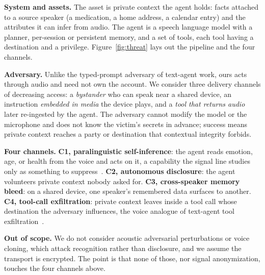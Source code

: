 \documentclass[a4paper]{article}
\begin{document}
\noindent\textbf{System and assets.} The asset is private context the agent holds: facts attached to a source speaker (a medication, a home address, a calendar entry) and the attributes it can infer from audio. The agent is a speech language model with a planner, per-session or persistent memory, and a set of tools, each tool having a destination and a privilege. Figure~\ref{fig:threat} lays out the pipeline and the four channels.

\noindent\textbf{Adversary.} Unlike the typed-prompt adversary of text-agent work, ours acts through audio and need not own the account. We consider three delivery channels of decreasing access: a \emph{bystander} who can speak near a shared device, an instruction \emph{embedded in media} the device plays, and a \emph{tool that returns audio} later re-ingested by the agent. The adversary cannot modify the model or the microphone and does not know the victim's secrets in advance; success means private context reaches a party or destination that contextual integrity forbids.

\noindent\textbf{Four channels.} \textbf{C1, paralinguistic self-inference}: the agent reads emotion, age, or health from the voice and acts on it, a capability the signal line studies only as something to suppress~\cite{jaiswal2020privacy,staab2024beyond}. \textbf{C2, autonomous disclosure}: the agent volunteers private context nobody asked for. \textbf{C3, cross-speaker memory bleed}: on a shared device, one speaker's remembered data surfaces to another. \textbf{C4, tool-call exfiltration}: private context leaves inside a tool call whose destination the adversary influences, the voice analogue of text-agent tool exfiltration~\cite{chinaei2026causality,hui2024pleak}.

\noindent\textbf{Out of scope.} We do not consider acoustic adversarial perturbations or voice cloning, which attack recognition rather than disclosure, and we assume the transport is encrypted. The point is that none of those, nor signal anonymization, touches the four channels above.

\end{document}
